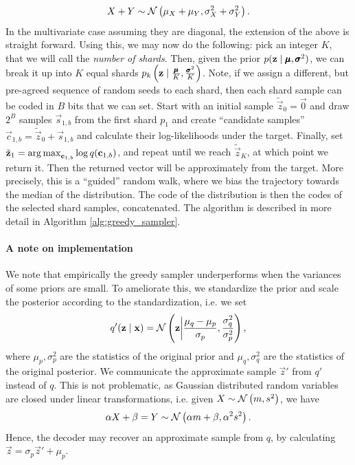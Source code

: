 \[
  X + Y \sim \mathcal{N}\left( \mu_X + \mu_Y, \sigma_X^2 + \sigma_Y^2 \right).
\]
In the multivariate case assuming they are diagonal, the extension of
the above is straight forward.
Using this, we may now do the following: pick an integer $K$, that
we will call the \textit{number of shards}. Then, given the prior
$p(\mathbf{z} \mid \pmb{\mu}, \pmb{\sigma}^2)$, we can break it up into $K$ equal
shards $p_k\left(\mathbf{z} \mid \frac{\pmb{\mu}}{K}, \frac{\pmb{\sigma}^2}{K}\right)$.
Note, if we assign a different, but pre-agreed sequence of random seeds to each
shard, then each shard sample can be coded in $B$ bits that we can set. Start
with an initial sample $\tilde{\vec{z}}_0 = \vec{0}$ and draw $2^B$
samples $\vec{s}_{1, b}$ from the first shard $p_1$ and create
``candidate samples'' $\vec{c}_{1, b} =
\tilde{\vec{z}}_0 + \vec{s}_{1, b}$ and calculate their log-likelihoods under the
target. Finally, set $\tilde{\mathbf{z}}_1 = \operatorname*{arg\,max}_{\mathbf{c}_{1, b}}\log
q(\mathbf{c}_{1, b})$, and repeat until we reach $\tilde{\vec{z}}_K$, at which
point we return it. Then the returned vector will be approximately from the
target. More precisely, this is a ``guided'' random walk, where we bias the
trajectory towards the median of the distribution. The code of the distribution
is then the codes of the selected shard samples, concatenated. The algorithm is described in
more detail in Algorithm \ref{alg:greedy_sampler}. 

\paragraph{A note on implementation}
We note that empirically the greedy sampler underperforms when the variances of
some priors are small. To ameliorate this, we standardize the prior and scale the
posterior according to the standardization, i.e. we set 
\[
  q'(\mathbf{z} \mid \mathbf{x}) = \mathcal{N}\left( \mathbf{z} \bigg| \frac{\mu_q -
      \mu_p}{\sigma_p}, \frac{\sigma^2_{q}}{\sigma^2_{p}} \right),
\]
where $\mu_p, \sigma^2_p$ are the statistics of the original prior and $\mu_q,
\sigma^2_q$ are the statistics of the original posterior. We communicate the
approximate sample $\vec{z}'$ from $q'$ instead of $q$. This is not problematic, as
Gaussian distributed random variables are closed under linear transformations,
i.e. given $X \sim \mathcal{N}\left( m, s^2 \right)$, we have
\[
  \alpha X + \beta = Y \sim \mathcal{N}\left( \alpha m + \beta, \alpha^2 s^2 \right).
\]
Hence, the decoder may recover an approximate sample from $q$, by calculating
$\vec{z} = \sigma_{p} \vec{z}' + \mu_{p}$.
